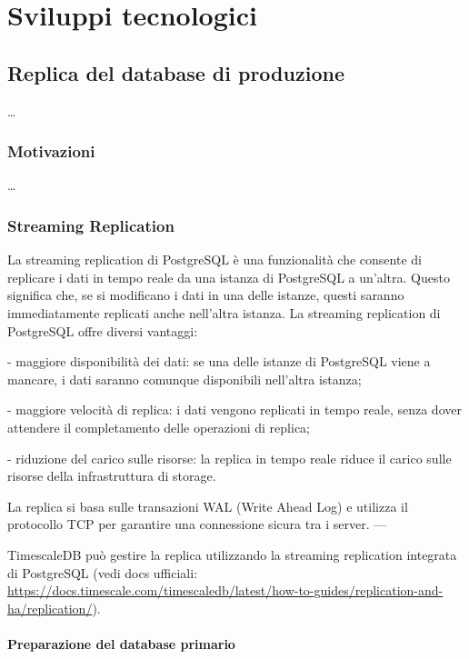 \chapter{Sviluppi tecnologici}\label{ch:sviluppi}

\section{Replica del database di produzione}\label{sec:replica}
\ldots

\subsection{Motivazioni}\label{ssec:replica-motivazioni}
\ldots

\subsection{Streaming Replication}\label{ssec:streaming-replication}
La streaming replication di PostgreSQL è una funzionalità che consente di replicare i dati in tempo reale da una istanza di PostgreSQL a un'altra. Questo significa che, se si modificano i dati in una delle istanze, questi saranno immediatamente replicati anche nell'altra istanza. La streaming replication di PostgreSQL offre diversi vantaggi:

- maggiore disponibilità dei dati: se una delle istanze di PostgreSQL viene a mancare, i dati saranno comunque disponibili nell'altra istanza;

- maggiore velocità di replica: i dati vengono replicati in tempo reale, senza dover attendere il completamento delle operazioni di replica;

- riduzione del carico sulle risorse: la replica in tempo reale riduce il carico sulle risorse della infrastruttura di storage.

La replica si basa sulle transazioni WAL (Write Ahead Log) e utilizza il protocollo TCP per garantire una connessione sicura tra i server.
---

TimescaleDB può gestire la replica utilizzando la streaming replication integrata di PostgreSQL (vedi docs ufficiali: \url{https://docs.timescale.com/timescaledb/latest/how-to-guides/replication-and-ha/replication/}).

\subsubsection{Preparazione del database primario}

